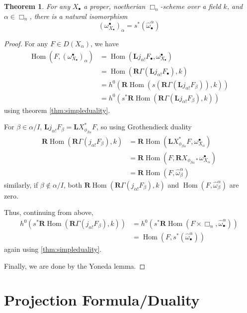 \documentclass{report}
\newtheorem{theorem}{Theorem}[section]
\theoremstyle{definition}
\DeclareMathOperator{\Hom}{Hom}
\newcommand{\bL}{\textbf{L}}
\newcommand{\bR}{\textbf{R}}
\begin{document}
\begin{theorem}
	For any $X_\bullet$ a proper, noetherian $\Box_n$-scheme over a field $k$, and $\alpha \in \Box_n$, there is a natural isomorphism
	\[
		(\omega_{X_\bullet}^\bullet)_\alpha = s^*(\hat{\omega}^\alpha_\bullet)
	\]
\end{theorem}
\begin{proof}
	For any $F \in D(X_\alpha)$, we have 
	\begin{align*}
	\Hom(F, (\omega_{X_\bullet}^\bullet)_\alpha) &= \Hom(\bL j_{\alpha !} F_\bullet, \omega_{X_\bullet}^\bullet) \\
	&= \Hom(\bR \Gamma(\bL j_{\alpha !} F_\bullet), k) \\
	&= h^0(\bR \Hom(s(\bR \Gamma (\bL j_{\alpha !} F_\beta)),k)) \\
	&= h^0(s^* \bR \Hom(\bR \Gamma(\bL j_{\alpha !} F_\beta), k))
	\end{align*}
	using theorem \ref{thm:simpleduality}.
	
	For $\beta \in \alpha / I$, $\bL j_{\alpha !} F_\beta = \bL X_{\phi_{\beta \alpha}}^* F$, so using Grothendieck duality
	\begin{align*}
		\bR \Hom(\bR \Gamma(j_{\alpha !} F_\beta),k)  &= \bR \Hom(\bL X_{\phi_{\beta \alpha}}^* F, \omega_{X_\alpha}^\bullet) \\
		&= \bR \Hom(F, \bR X_{\phi_{\beta \alpha} *} \omega_{X_\alpha}^\bullet) \\
		&= \bR \Hom(F, \hat{\omega}^\alpha_\beta)
	\end{align*}
	similarly, if $\beta \not \in \alpha / I$, both $\bR \Hom(\bR \Gamma(j_{\alpha !} F_\beta), k)$ and $\Hom(F, \hat{\omega}^\alpha_\beta)$ are zero.
	
	Thus, continuing from above,
	\begin{align*}
		h^0(s^* \bR \Hom(\bR \Gamma(j_{\alpha !} F_\beta), k)) &= h^0(s^* \bR \Hom(F \times \Box_n, \hat{\omega}^\alpha_\bullet)) \\
		&= \Hom(F, s^*(\hat{\omega}^\alpha_\bullet))
	\end{align*}
	again using \ref{thm:simpleduality}.
	
	Finally, we are done by the Yoneda lemma.
\end{proof}

\section{Projection Formula/Duality}
\end{document}
